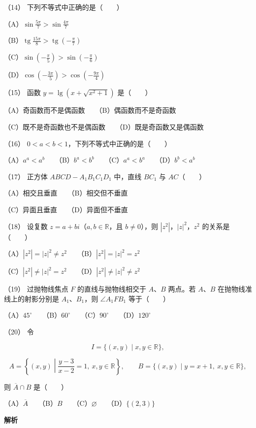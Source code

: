 \begin{answer}
（14） 下列不等式中正确的是\mbox{（　　）}

（A）$\sin\frac{5\pi}7>\sin\frac{4\pi}7$

（B）$\operatorname{tg}\frac{15\pi}8>\operatorname{tg}\left(-\frac\pi7\right)$

（C）$\sin\left(-\frac\pi5\right)>\sin\left(-\frac\pi6\right)$

（D）$\cos\left(-\frac{3\pi}5\right)>\cos\left(-\frac{9\pi}4\right)$

（15） 函数 $y=\lg\left(x+\sqrt{x^2+1}\right)$ 是\mbox{（　　）}

（A）奇函数而不是偶函数　　（B）偶函数而不是奇函数

（C）既不是奇函数也不是偶函数　　（D）既是奇函数又是偶函数

（16） $0<a<b<1$，下列不等式中正确的是\mbox{（　　）}

（A）$a^a<a^b$　　（B）$b^a<b^b$　　（C）$a^a<b^a$　　（D）$b^b<a^b$

（17） 正方体 $ABCD-A_1B_1C_1D_1$ 中，直线 $BC_1$ 与 $AC$\mbox{（　　）}

（A）相交且垂直　　（B）相交但不垂直

（C）异面且垂直　　（D）异面但不垂直

（18） 设复数 $z=a+bi$（$a,b\in\mathbb R$，且 $b\ne0$），则 $|z^2|$，$|z|^2$，$z^2$ 的关系是\mbox{（　　）}

（A）$|z^2|=|z|^2\ne z^2$　　（B）$|z^2|=|z|^2=z^2$

（C）$|z^2|\ne|z|^2=z^2$　　（D）$|z^2|\ne|z|^2\ne z^2$

（19） 过抛物线焦点 $F$ 的直线与抛物线相交于 $A\text{、}B$ 两点。若 $A\text{、}B$ 在抛物线准线上的射影分别是 $A_1\text{、}B_1$，则 $\angle A_1FB_1$ 等于\mbox{（　　）}

（A）$45^\circ$　　（B）$60^\circ$　　（C）$90^\circ$　　（D）$120^\circ$

（20） 令

\nopagebreak[4]
\[
I=\{(x,y)\mid x,y\in\mathbb R\},
\]

\nopagebreak[4]
\[
A=\left\{(x,y)\middle|\frac{y-3}{x-2}=1,\ x,y\in\mathbb R\right\},
\qquad
B=\{(x,y)\mid y=x+1,\ x,y\in\mathbb R\},
\]

则 $\overline A\cap B$ 是\mbox{（　　）}

（A）$\overline A$　　（B）$B$　　（C）$\varnothing$　　（D）$\{(2,3)\}$

\textbf{解析}



\end{answer}
